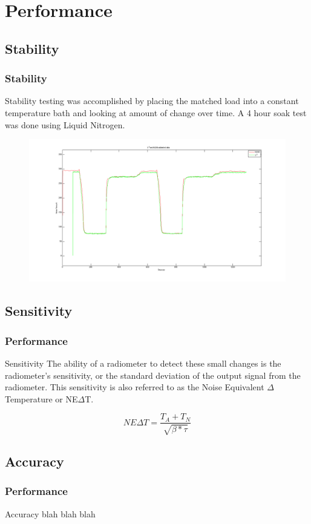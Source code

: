 \documentclass[notes]{beamer}
\begin{document}
\section{Performance}
\subsection{Stability}
\begin{frame}
\frametitle{Stability}

Stability testing was accomplished by placing the matched load into a constant temperature bath and looking at amount of change over time.  A 4 hour soak test was done using Liquid Nitrogen.
\begin{figure}\label{money_shot}
\includegraphics[width=1.0\linewidth]{images/lab1_both_calib.png}
\end{figure} 
\end{frame}
\subsection{Sensitivity}
\begin{frame}
\frametitle{Performance}
\begin{block}{Sensitivity}
The ability of a radiometer to detect these small changes is the radiometer's sensitivity, or the standard deviation of the output signal from the radiometer.  This sensitivity is also referred to as the Noise Equivalent $\Delta$ Temperature or NE$\Delta$T. 

\begin{equation}\label{NEAT}
NE\Delta T=\frac{T_{A}+T_{N}}{\sqrt{\beta * \tau}}
\end{equation}
\end{block}
\end{frame}
\subsection{Accuracy}
\begin{frame}
\frametitle{Performance}
\begin{block}{Accuracy}
blah blah blah
\end{block}
\end{frame}
\end{document}
